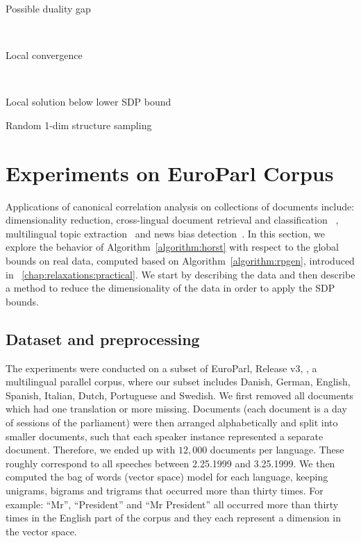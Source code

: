 \begin{table}[t]
    \begin{subtable}[t]{.5\textwidth}
        \centering
        
        \caption{Possible duality gap}
        \label{tb:r1d_dg}
    \end{subtable}
    ~
    \begin{subtable}[t]{.5\textwidth}
        \centering
        
        \caption{Local convergence}
        \label{tb:r1d_lc}
    \end{subtable}
    ~
    \begin{subtable}[t]{\textwidth}
        \centering
        
        \caption{Local solution below lower SDP bound}
        \label{tb:r1d_lb}
    \end{subtable}
  \caption{Random 1-dim structure sampling}
  \label{tb:r1d}
\end{table}

\section{Experiments on EuroParl Corpus}\label{subsec:documents}

Applications of canonical correlation analysis on collections of
documents include: dimensionality reduction, cross-lingual document retrieval and classification~
\cite{ccatext, ccatextdva}, multilingual topic extraction~\cite{mcca} and news bias detection~\cite{ccanewsbias}. 
In this section, we explore the behavior of
Algorithm~\ref{algorithm:horst} with respect to the global
bounds on real data, computed based on Algorithm~\ref{algorithm:rpgen}, 
introduced in ~\ref{chap:relaxations:practical}. 
We start by describing the data and then describe a method to
reduce the dimensionality of the data in order to apply the SDP
bounds.

\subsection{Dataset and preprocessing}
The experiments were conducted on a subset of EuroParl, Release v3,
\cite{europarl}, a multilingual parallel corpus, where our subset
includes Danish, German, English, Spanish, Italian, Dutch,
Portuguese and Swedish. We first removed all documents
which had one translation or more missing. Documents (each
document is a day of sessions of the parliament) were then
arranged alphabetically and split into smaller documents, such that
each speaker instance represented a separate document.
Therefore, we ended up with $12,000$ documents per
language. These roughly correspond to all speeches between 2.25.1999
and 3.25.1999. We then computed the bag of words (vector space)
\cite{Salton88term-weightingapproaches} model for each language,
keeping unigrams, bigrams and trigrams that occurred
more than thirty times. For example: ``Mr'', ``President'' and
``Mr President'' all occurred more than thirty times in the
English part of the corpus and they each represent a dimension in
the vector space.

